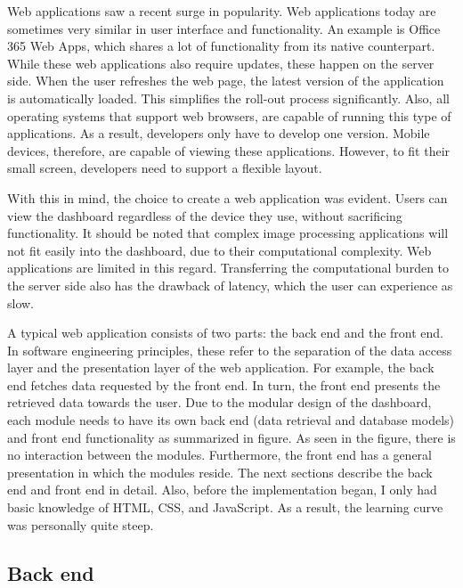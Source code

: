     Web applications saw a recent surge in popularity. Web applications today are sometimes very similar in user interface and functionality. An example is Office 365 Web Apps, which shares a lot of functionality from its native counterpart. While these web applications also require updates, these happen on the server side. When the user refreshes the web page, the latest version of the application is automatically loaded. This simplifies the roll-out process significantly. Also, all operating systems that support web browsers, are capable of running this type of applications. As a result, developers only have to develop one version. Mobile devices, therefore, are capable of viewing these applications. However, to fit their small screen, developers need to support a flexible layout.

    With this in mind, the choice to create a web application was evident. Users can view the dashboard regardless of the device they use, without sacrificing functionality. It should be noted that complex image processing applications will not fit easily into the dashboard, due to their computational complexity. Web applications are limited in this regard. Transferring the computational burden to the server side also has the drawback of latency, which the user can experience as slow.

    A typical web application consists of two parts: the back end and the front end. In software engineering principles, these refer to the separation of the data access layer and the presentation layer of the web application. For example, the back end fetches data requested by the front end. In turn, the front end presents the retrieved data towards the user. Due to the modular design of the dashboard, each module needs to have its own back end (data retrieval and database models) and front end functionality as summarized in figure.  As seen in the figure, there is no interaction between the modules. Furthermore, the front end has a general presentation in which the modules reside. The next sections describe the back end and front end in detail. Also, before the implementation began, I only had basic knowledge of HTML, CSS, and JavaScript. As a result, the learning curve was personally quite steep.

    \subsection{Back end}


